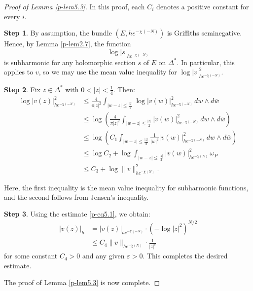 \documentclass[12pt,twoside]{amsart}
\theoremstyle{definition}
\newtheorem{step}{Step}
\begin{document}
\begin{proof}[Proof of Lemma \ref{p-lem5.3}]
\setcounter{step}{0}
In this proof, each $C_i$ denotes a positive constant 
for every $i$. 

\begin{step}\label{p-step5.3-1}
By assumption, the bundle $(E, he^{-\chi(-N)})$ is Griffiths seminegative.  
Hence, by Lemma \ref{p-lem2.7}, the function  
\[
\log |s|_{he^{-\chi(-N)}}
\]  
is subharmonic for any holomorphic section $s$ of $E$ on $\Delta^*$.  
In particular, this applies to $v$, so we may use the mean value inequality for $\log |v|^2_{he^{-\chi(-N)}}$.
\end{step}

\begin{step}\label{p-step5.3-2}
Fix $z \in \Delta^*$ with $0 < |z| < \tfrac{1}{4}$. Then:
\begin{equation}\label{p-eq5.1}
\begin{split}
\log |v(z)|^2_{he^{-\chi(-N)}} 
&\leq \frac{4}{\pi |z|^2} \int_{|w - z| \leq \frac{|z|}{2}} 
\log |v(w)|^2_{he^{-\chi(-N)}} \, dw \wedge d\overline{w} \\
&\leq \log \left( \frac{4}{\pi |z|^2} \int_{|w - z| \leq \frac{|z|}{2}} 
|v(w)|^2_{he^{-\chi(-N)}} \, dw \wedge d\overline{w} \right) \\
&\leq \log \left( C_1 \int_{|w - z| \leq \frac{|z|}{2}} 
\frac{1}{|w|^2} |v(w)|^2_{he^{-\chi(-N)}} \, dw \wedge d\overline{w} \right) \\
&\leq \log C_2 + \log \int_{|w - z| \leq \frac{|z|}{2}} 
|v(w)|^2_{he^{-\chi(N)}} \, \omega_P \\
&\leq C_3 + \log \|v\|^2_{he^{-\chi(N)}}.
\end{split}
\end{equation}

Here, the first inequality is the 
mean value inequality for subharmonic functions,  
and the second follows from Jensen's inequality.  
\end{step}

\begin{step}\label{p-step5.3-3}
Using the estimate \eqref{p-eq5.1}, we obtain:
\[
\begin{split}
|v(z)|_h 
&= |v(z)|_{he^{-\chi(-N)}} \cdot (-\log |z|^2)^{N/2} \\
&\leq C_4 \|v\|_{he^{-\chi(N)}} \cdot \frac{1}{|z|^\varepsilon}
\end{split}
\]
for some constant $C_4 > 0$ and any 
given $\varepsilon > 0$. 
This completes the desired estimate.
\end{step}

The proof of Lemma \ref{p-lem5.3} is now complete.
\end{proof}
\end{document}

